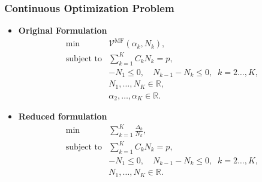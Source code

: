 \documentclass{beamer}
\begin{document}
\begin{frame}[t]
    \frametitle{Continuous Optimization Problem}
    \begin{itemize}[leftmargin=5pt] 
     \vspace{3mm}
        \item \textcolor{myblue3}{\bf Original Formulation}
        {\footnotesize
        \begin{equation*}\label{eq:Optimization_pb_sample_size}
            \begin{array}{ll}
            \min &\mathcal{V}^{\text{MF}}(\alpha_k, N_k),\\
               \text{subject to} &\displaystyle\sum\limits_{k=1}^K C_kN_k=p,\\[2pt]
               &\displaystyle -N_1\le 0,\quad \displaystyle N_{k-1}-N_k\le 0, \;\; k=2\ldots,K,\\
               &N_1,\ldots, N_K\in \mathbb{R},\\
               &\alpha_2,\ldots,\alpha_K\in \mathbb{R}.
            \end{array}
        \end{equation*}
        }

        \item \textcolor{myblue3}{\bf  Reduced formulation}
        {\footnotesize
        \begin{equation*}\label{eq:Optimization_pb_sample_size}
            \begin{array}{ll}
            \min &\displaystyle\sum_{k=1}^K \frac{\Delta_k}{N_k},\\
            \text{subject to} &\displaystyle\sum\limits_{k=1}^K C_kN_k=p,\\[2pt]
               &\displaystyle -N_1\le 0,\quad \displaystyle N_{k-1}-N_k\le 0, \;\; k=2\ldots,K,\\
               &N_1,\ldots, N_K\in \mathbb{R}.
            \end{array}
        \end{equation*}
        }
        
    \end{itemize}
\end{frame}
\end{document}

